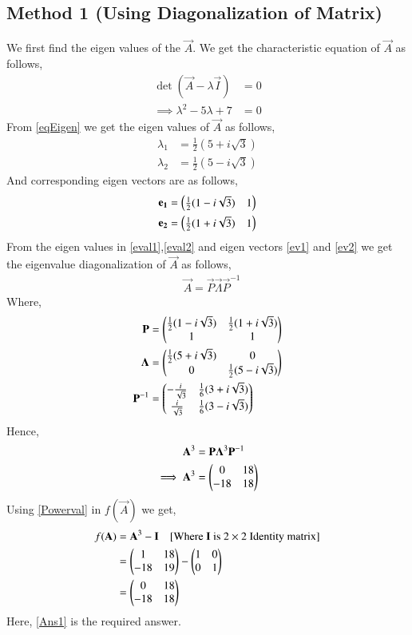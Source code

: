 \documentclass[journal,12pt,twocolumn]{IEEEtran}
\begin{document}
\subsection{Method 1 (Using Diagonalization of Matrix)}
We first find the eigen values of the $\vec{A}$. We get the characteristic equation of $\vec{A}$ as follows,
\begin{align}
\det{(\vec{A} - \lambda \vec{I})} &= 0\\
\implies\lambda^2 - 5\lambda+7 &=0\label{eqEigen}
\end{align}
From \eqref{eqEigen} we get the eigen values of $\vec{A}$ as follows,
\begin{align}
\lambda_1 &= \frac{1}{2}(5+i\sqrt{3})\label{eval1}\\ 
\lambda_2 &= \frac{1}{2}(5-i\sqrt{3})\label{eval2}
\end{align}
And corresponding eigen vectors are as follows,
\begin{align}
\mathbf{e_1} &= \begin{pmatrix}\frac{1}{2}(1-i\sqrt{3})&1\end{pmatrix}\label{ev1}\\
\mathbf{e_2} &= \begin{pmatrix}\frac{1}{2}(1+i\sqrt{3})&1\end{pmatrix}\label{ev2}
\end{align}
From the eigen values in \eqref{eval1},\eqref{eval2} and eigen vectors \eqref{ev1} and \eqref{ev2} we get the eigenvalue diagonalization of $\vec{A}$ as follows,
\begin{align}
&\vec{A} = \vec{P}\vec{\Lambda}\vec{P}^{-1}\label{diag}
\end{align}
Where,
\begin{align}
\mathbf{P} &= \begin{pmatrix}\frac{1}{2}(1-i\sqrt{3})&\frac{1}{2}(1+i\sqrt{3})\\1&1\end{pmatrix}\\
\mathbf{\Lambda} &= \begin{pmatrix}\frac{1}{2}(5+i\sqrt{3})&0\\0&\frac{1}{2}(5-i\sqrt{3})\end{pmatrix}\\
\mathbf{P}^{-1} &= \begin{pmatrix}-\frac{i}{\sqrt{3}}&\frac{1}{6}(3+i\sqrt{3})\\\frac{i}{\sqrt{3}}&\frac{1}{6}(3-i\sqrt{3})\end{pmatrix}
\end{align}
Hence,
\begin{align}
\mathbf{A}^3 &= \mathbf{P}\mathbf{\Lambda}^3\mathbf{P}^{-1}\\
\implies \mathbf{A}^3 &= \begin{pmatrix}0&18\\-18&18\end{pmatrix}\label{Powerval}
\end{align}
Using \eqref{Powerval} in $f(\vec{A})$ we get,
\begin{align}
f(\mathbf{A}) &= \mathbf{A}^3 - \mathbf{I} \quad{\text{[Where $\mathbf{I}$ is $2 \times 2$ Identity matrix]}}\\
&= \begin{pmatrix}1&18\\-18&19\end{pmatrix} - \begin{pmatrix}1&0\\0&1\end{pmatrix}\\
&= \begin{pmatrix}0&18\\-18&18\end{pmatrix}\label{Ans1}
\end{align}
Here, \eqref{Ans1} is the required answer.
\end{document}
